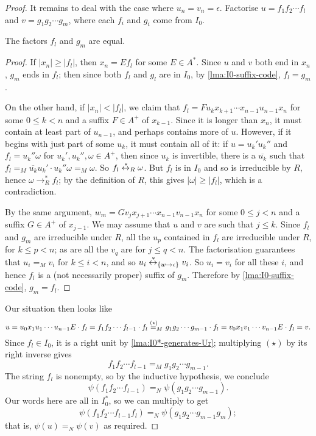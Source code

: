 \documentclass[noindex,noinsetproof,12pt]{lmaths}
\newcommand{\leftrightst}{\mathrel{\smash{\stackrel{\hspace{0.1em}\ast}{\leftrightarrow}}}}
\begin{document}
\begin{proof}
	It remains to deal with the case where $u_n = v_n = \epsilon$. Factorise $u = f_1 f_2 \cdots f_l$ and $v = g_1 g_2 \cdots g_m$, where each $f_i$ and $g_i$ come from $I_0$.

	\begin{claim*}
		The factors $f_l$ and $g_m$ are equal.
	\end{claim*}
	\begin{proof}	
	If $|x_n| \ge |f_l|$, then $x_n = Ef_l$ for some $E \in A^*$. Since $u$ and $v$ both end in $x_n$, $g_m$ ends in $f_l$; then since both $f_l$ and $g_l$ are in $I_0$, by \cref{lma:I0-suffix-code}, $f_l = g_m$.

	On the other hand, if $|x_n| < |f_l|$, we claim that $f_l = Fu_k x_{k+1} \cdots x_{n-1}u_{n-1}x_n$ for some $0 \le k < n$ and a suffix $F \in A^+$ of $x_{k-1}$. Since it is longer than $x_n$, it must contain at least part of $u_{n-1}$, and perhaps contains more of $u$. However, if it begins with just part of some $u_k$, it must contain all of it: if $u = u_k'u_k''$ and $f_l = u_k''\omega$ for $u_k', u_k'', \omega \in A^+$, then since $u_k$ is invertible, there is a $\overline{u_k}$ such that $f_l =_M \overline{u_k}u_k' \cdot u_k''\omega =_M \omega$. So $f_l \leftrightst_R \omega$. But $f_l$ is in $I_0$ and so is irreducible by $R$, hence $\omega \to^*_R f_l$; by the definition of $R$, this gives $|\omega| \ge |f_l|$, which is a contradiction.

		By the same argument, $w_m = Gv_jx_{j+1} \cdots x_{n-1}v_{n-1}x_n$ for some $0 \le j < n$ and a suffix $G \in A^+$ of $x_{j-1}$. We may assume that $u$ and $v$ are such that $j \le k$. Since $f_l$ and $g_m$ are irreducible under $R$, all the $u_p$ contained in $f_l$ are irreducible under $R$, for $k \le p < n$; as are all the $v_q$ are for $j \le q < n$. The factorisation guarantees that $u_i =_M v_i$ for $k \le i < n$, and so $u_i \leftrightst_{\{w\to\epsilon\}} v_i$. So $u_i = v_i$ for all these $i$, and hence $f_l$ is a (not necessarily proper) suffix of $g_m$. Therefore by \cref{lma:I0-suffix-code}, $g_m = f_l$.
	\end{proof}

	Our situation then looks like
		\[ u =  u_0x_1u_1\cdots u_{n-1}E \cdot f_l = f_1f_2\cdots f_{l-1} \cdot f_l \stackrel{(\star)\hphantom{{}_M}}{=_M} g_1g_2\cdots g_{m-1} \cdot f_l = v_0x_1v_1\cdots v_{n-1}E \cdot f_l = v. \]
	Since $f_l \in I_0$, it is a right unit by \cref{lma:I0*-generates-Ur}; multiplying $(\star)$ by its right inverse gives
		\[ f_1f_2\cdots f_{l-1} =_M g_1g_2\cdots g_{m-1}. \]
	The string $f_l$ is nonempty, so by the inductive hypothesis, we conclude
		\[ \psi(f_1 f_2 \cdots f_{l-1}) =_N \psi(g_1 g_2\cdots g_{m-1}). \]
	Our words here are all in $I_0^*$, so we can multiply to get
		\[ \psi(f_1 f_2 \cdots f_{l-1} f_l) =_N \psi(g_1 g_2\cdots g_{m-1} g_m); \]
	that is, $\psi(u) =_N \psi(v)$ as required.
\end{proof}
\end{document}
